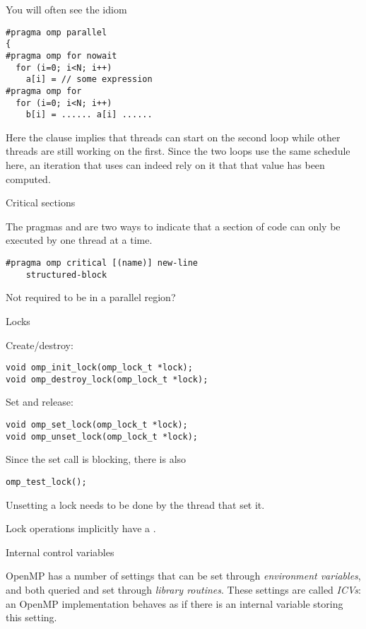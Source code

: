You will often see the idiom
\begin{verbatim}
#pragma omp parallel
{
#pragma omp for nowait
  for (i=0; i<N; i++)
    a[i] = // some expression
#pragma omp for
  for (i=0; i<N; i++)
    b[i] = ...... a[i] ......
\end{verbatim}
Here the  clause implies that threads can start on the second loop
while other threads are still working on the first. Since the two loops use the same
schedule here, an iteration that uses  can indeed rely on it that that 
value has been computed.

 {Critical sections}

The pragmas  and 
are two ways to indicate that a section of code can only be executed
by one thread at a time.

\begin{verbatim}
#pragma omp critical [(name)] new-line
    structured-block
\end{verbatim}

Not required to be in a parallel region?

 {Locks}
\label{ompref:locks}

Create/destroy:
\begin{verbatim}
void omp_init_lock(omp_lock_t *lock);
void omp_destroy_lock(omp_lock_t *lock);
\end{verbatim}
Set and release:
\begin{verbatim}
void omp_set_lock(omp_lock_t *lock);
void omp_unset_lock(omp_lock_t *lock);
\end{verbatim}
Since the set call is blocking, there is also 
\begin{verbatim}
omp_test_lock();
\end{verbatim}

Unsetting a lock needs to be done by the thread that set it.

Lock operations implicitly have a .

 {Internal control variables}
\label{ref:omp-environ}

OpenMP has a number of settings that can be set through \emph{environment variables},
and both queried and set through \emph{library routines}. These settings are called
\emph{\acfp{ICV}}: an OpenMP implementation behaves as if there is an internal variable
storing this setting.

